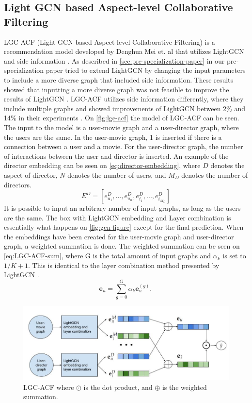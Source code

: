 \subsection{Light GCN based Aspect-level Collaborative Filtering}
LGC-ACF (Light GCN based Aspect-level Collaborative Filtering) is a recommendation model developed by Denghua Mei et. al that utilizes LightGCN and side information \cite{LGC-ACF}.
As described in \autoref{sec:pre-specialization-paper} in our pre-specialization paper tried to extend LightGCN by changing the input parameters to include a more diverse graph that included side information.
These results showed that inputting a more diverse graph was not feasible to improve the results of LightGCN \cite{Pre-specialisation}.
LGC-ACF utilizes side information differently, where they include multiple graphs and showed improvements of LightGCN between 2\% and 14\% in their experiments \cite{LGC-ACF}.
On \autoref{fig:lgc-acf} the model of LGC-ACF can be seen.
The input to the model is a user-movie graph and a user-director graph, where the users are the same.
In the user-movie graph, 1 is inserted if there is a connection between a user and a movie.
For the user-director graph, the number of interactions between the user and director is inserted.
An example of the director embedding can be seen on \autoref{eq:director-embedding}, where $D$ denotes the aspect of director, $N$ denotes the number of users, and $M_D$ denotes the number of directors.
\begin{equation}
    E^D = [e_{u_1}^D, ... , e_{u_n}^D, e_{i_1}^D, ..., e_{i_{M_D}}^D]
    \label{eq:director-embedding}
\end{equation}
It is possible to input an arbitrary number of input graphs, as long as the users are the same.
The box with LightGCN embedding and Layer combination is essentially what happens on \autoref{fig:gcn-figure} except for the final prediction.
When the embeddings have been created for the user-movie graph and user-director graph, a weighted summation is done.
The weighted summation can be seen on \autoref{eq:LGC-ACF-sum}, where G is the total amount of input graphs and $\alpha_k$ is set to $1/K + 1$.
This is identical to the layer combination method presented by LightGCN \cite{lightgcn}.
\begin{equation}
    \mathbf{e}_u = \sum_{g=0}^{G} \alpha_k \mathbf{e}_u^{(g)},
    \label{eq:LGC-ACF-sum}
\end{equation}
\begin{figure}[h!]
    \includegraphics[width=1.1\textwidth]{figures/LGC-ACF.jpg}
    \centering
    \caption{LGC-ACF where $\odot$ is the dot product, and $\oplus$ is the weighted summation.}
    \label{fig:lgc-acf}
\end{figure}